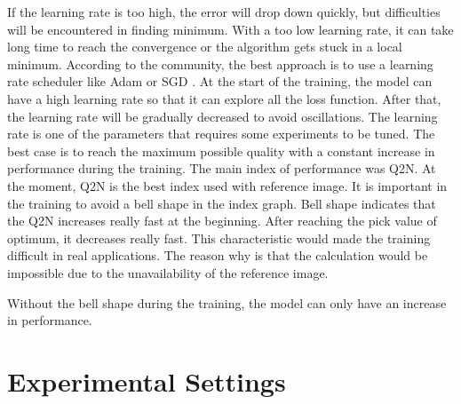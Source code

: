 \documentclass[12pt]{report}
\begin{document}
If the learning rate is too high, the error will drop down quickly, but difficulties will be encountered in finding minimum.
With a too low learning rate, it can take long time to reach the convergence or the algorithm gets stuck in a local minimum.
According to the community, the best approach is to use a learning rate scheduler like Adam \cite{adam} or SGD \cite{sgd}.
At the start of the training, the model can have a high learning rate so that it can explore all the loss function.
After that, the learning rate will be gradually decreased to avoid oscillations.
The learning rate is one of the parameters that requires some experiments to be tuned.
The best case is to reach the maximum possible quality with a constant increase in performance during the training.
The main index of performance was Q2N. At the moment, Q2N is the best index used with reference image.
It is important in the training to avoid a bell shape in the index graph. Bell shape indicates that the Q2N increases really fast at the beginning.
After reaching the pick value of optimum, it decreases really fast. 
This characteristic would made the training difficult in real applications.
The reason why is that the calculation would be impossible due to the unavailability of the reference image.

Without the bell shape during the training, the model can only have an increase in performance.


\section{Experimental Settings}
\end{document}
